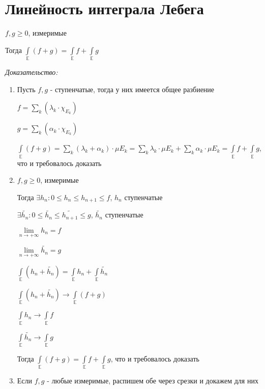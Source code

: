 \documentclass[paper=a4, fontsize=17pt]{article}
\begin{document}
\section{Линейность интеграла Лебега}

$f, g \geqslant 0$, измеримые

Тогда $\int\limits_{\mathds{E}} (f + g) = \int\limits_{\mathds{E}} f + \int\limits_{\mathds{E}} g$

\emph{Доказательство:}

\begin{enumerate}
	\item Пусть $f, g$ - ступенчатые, тогда у них имеется общее разбиение

	$f = \sum\limits_{k}(\lambda_k \cdot \chi_{E_k})$

	$g = \sum\limits_{k}(\alpha_k \cdot \chi_{E_k})$

	$\int\limits_{\mathds{E}} (f + g) = \sum\limits_k (\lambda_k + \alpha_k) \cdot \mu E_k = \sum\limits_k \lambda_k \cdot \mu E_k + \sum\limits_k \alpha_k \cdot \mu E_k = \int\limits_{\mathds{E}} f + \int\limits_{\mathds{E}} g$, что и требовалось доказать

	\item $f, g \geqslant 0$, измеримые

	Тогда $\exists h_n: 0 \leqslant h_n \leqslant h_{n + 1} \leqslant f$, $h_n$ ступенчатые

	$\exists \widetilde{h_n}: 0 \leqslant \widetilde{h_n} \leqslant \widetilde{h_{n + 1}} \leqslant g$, $\widetilde{h_n}$ ступенчатые

	$\lim\limits_{n \rightarrow +\infty} h_n = f$

	$\lim\limits_{n \rightarrow +\infty} \widetilde{h_n} = g$

	$\int\limits_{\mathds{E}} (h_n + \widetilde{h_n}) = \int\limits_{\mathds{E}} h_n + \int\limits_{\mathds{E}} \widetilde{h_n}$

	$\int\limits_{\mathds{E}} (h_n + \widetilde{h_n}) \rightarrow \int\limits_{\mathds{E}} (f + g)$

	$\int\limits_{\mathds{E}} h_n \rightarrow \int\limits_{\mathds{E}} f$

	$\int\limits_{\mathds{E}} \widetilde{h_n} \rightarrow \int\limits_{\mathds{E}} g$

	Тогда $\int\limits_{\mathds{E}} (f + g) = \int\limits_{\mathds{E}} f + \int\limits_{\mathds{E}} g$, что и требовалось доказать

	\item
	Если $f, g$ - любые измеримые, распишем обе через срезки и докажем для них
\end{enumerate}
\end{document}
